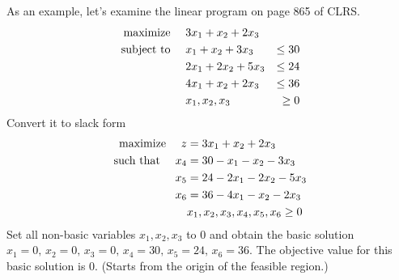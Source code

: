 As an example, let's examine the linear program on page 865 of CLRS.
\[
    \begin{aligned}
        \text{maximize \quad } & 3x_1 + x_2 + 2x_3 \\
        \text{subject to \quad } &x_1 + x_2 + 3x_3 &\leq 30 \\
        &2x_1 + 2x_2 + 5x_3 &\leq 24 \\
        &4x_1 + x_2 + 2x_3 &\leq 36 \\
        &x_1, x_2, x_3 &\geq 0
    \end{aligned}
\]
Convert it to slack form
\[
    \begin{aligned}
        \text{maximize \quad }  z &= 3x_1 + x_2 + 2x_3 \\
        \text{such that \quad } x_4 &= 30 - x_1 - x_2 - 3x_3 \\
        x_5 &= 24 - 2x_1 - 2x_2 - 5x_3 \\
        x_6 &= 36 - 4x_1 - x_2 - 2x_3 \\
        & x_1, x_2, x_3, x_4, x_5, x_6 \geq 0
    \end{aligned}
\]
Set all non-basic variables $x_1,x_2,x_3$ to 0 and obtain the basic solution $x_1=0,\,x_2=0,\,x_3=0,\,x_4=30,\,x_5=24,\,x_6=36$. The objective value for this basic solution is 0. (Starts from the origin of the feasible region.)

